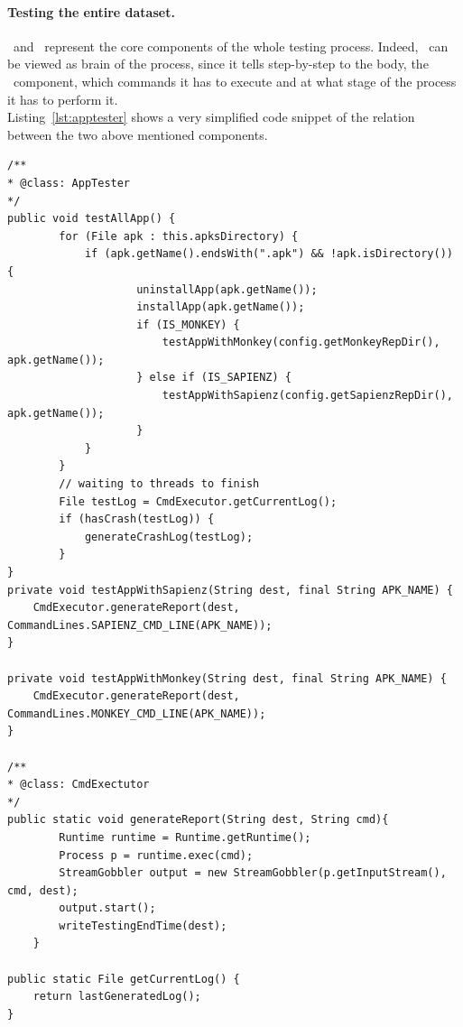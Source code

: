 \paragraph{Testing the entire dataset.} 
\AppTester\ and \Cmd\ represent the core components of the whole testing process. Indeed, \AppTester\ can be viewed as brain of the process, since it tells step-by-step to the body, \ie the \Cmd\ component, which commands it has to execute and at what stage of the process it has to perform it. \\
Listing~\ref{lst:apptester} shows a very simplified code snippet of the relation between the two above mentioned components. 
\begin{lstlisting}[caption=Testing mechanism between \AppTester\ and \Cmd\, ,label={lst:apptester}]
/**
* @class: AppTester
*/
public void testAllApp() {
        for (File apk : this.apksDirectory) {
            if (apk.getName().endsWith(".apk") && !apk.isDirectory()) {
                    uninstallApp(apk.getName());
                    installApp(apk.getName());
                    if (IS_MONKEY) {
                        testAppWithMonkey(config.getMonkeyRepDir(), apk.getName());
                    } else if (IS_SAPIENZ) {
                        testAppWithSapienz(config.getSapienzRepDir(), apk.getName());
                    }
            }
        } 
        // waiting to threads to finish 
        File testLog = CmdExecutor.getCurrentLog();
        if (hasCrash(testLog)) {
            generateCrashLog(testLog);
        }
} 
private void testAppWithSapienz(String dest, final String APK_NAME) {
	CmdExecutor.generateReport(dest, CommandLines.SAPIENZ_CMD_LINE(APK_NAME)); 
}

private void testAppWithMonkey(String dest, final String APK_NAME) {
	CmdExecutor.generateReport(dest, CommandLines.MONKEY_CMD_LINE(APK_NAME)); 
}

/**
* @class: CmdExectutor
*/
public static void generateReport(String dest, String cmd){
        Runtime runtime = Runtime.getRuntime();
        Process p = runtime.exec(cmd);
        StreamGobbler output = new StreamGobbler(p.getInputStream(), cmd, dest); 
        output.start();
        writeTestingEndTime(dest);
    }
    
public static File getCurrentLog() {
    return lastGeneratedLog();
}
    
\end{lstlisting}


